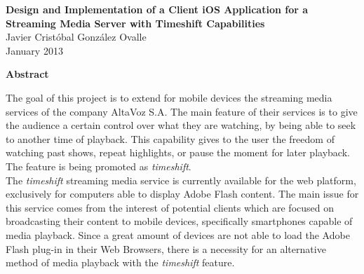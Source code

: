 \newpage
\thispagestyle{empty}
\begin{center}
 \Large \textbf{Design and Implementation of a Client iOS Application for a Streaming Media Server with Timeshift Capabilities}\\
  

\normalsize Javier Cristóbal González Ovalle \\
\normalsize January 2013

\Large \textbf{Abstract}

\end{center}
\normalsize

The goal of this project is to extend for mobile devices the streaming media services of the company AltaVoz S.A. The main feature of their services is to give the audience a certain control over what they are watching, by being able to seek to another time of playback. This capability gives to the user the freedom of watching past shows, repeat highlights, or pause the moment for later playback. The feature is being promoted as \textit{timeshift}.\\



The \textit{timeshift} streaming media service is currently available for the web platform, exclusively for computers able to display Adobe Flash content. The main issue for this service comes from the interest of potential clients which are focused on broadcasting their content to mobile devices, specifically smartphones capable of media playback. Since a great amount of devices are not able to load the Adobe Flash plug-in in their Web Browsers, there is a necessity for an alternative method of media playback with the \textit{timeshift} feature.\\

